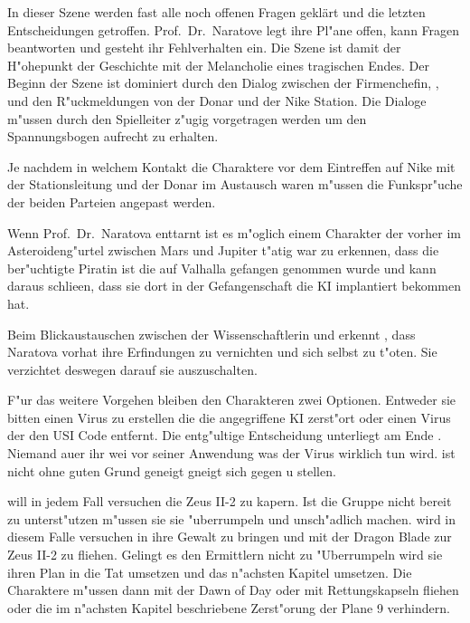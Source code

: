 \begin{remarks}
	In dieser Szene werden fast alle noch offenen Fragen geklärt und die letzten Entscheidungen getroffen. Prof.~Dr.~Naratove legt ihre Pl"ane offen, kann Fragen beantworten und gesteht ihr Fehlverhalten ein. Die Szene ist damit der H"ohepunkt der Geschichte mit der Melancholie eines tragischen Endes. Der Beginn der Szene ist dominiert durch den Dialog zwischen der Firmenchefin, \xl{}, \ml{} und den R"uckmeldungen von der Donar und der Nike Station. Die Dialoge m"ussen durch den Spielleiter z"ugig vorgetragen werden um den Spannungsbogen aufrecht zu erhalten.

	Je nachdem in welchem Kontakt die Charaktere vor dem Eintreffen auf Nike mit der Stationsleitung und der Donar im Austausch waren m"ussen die Funkspr"uche der beiden Parteien angepast werden.

	Wenn Prof.~Dr.~Naratova \xl{} enttarnt ist es m"oglich einem Charakter der vorher im Asteroideng"urtel zwischen Mars und Jupiter t"atig war zu erkennen, dass \xl{} die ber"uchtigte Piratin ist die auf Valhalla gefangen genommen wurde und kann daraus schlie\3en, dass sie dort in der Gefangenschaft die KI implantiert bekommen hat.

	Beim Blickaustauschen zwischen der Wissenschaftlerin und \xl{} erkennt \xl{}, dass Naratova vorhat ihre Erfindungen zu vernichten und sich selbst zu t"oten. Sie verzichtet deswegen darauf sie auszuschalten.

	F"ur das weitere Vorgehen bleiben den Charakteren zwei Optionen. Entweder sie bitten \ml{} einen Virus zu erstellen die die angegriffene KI zerst"ort oder einen Virus der den USI Code entfernt. Die entg"ultige Entscheidung unterliegt am Ende \ml{}. Niemand au\3er ihr wei\3 vor seiner Anwendung was der Virus wirklich tun wird. \ml{} ist  nicht ohne guten Grund geneigt gneigt sich gegen \xl{} u stellen. 
	
	\xl{} will in jedem Fall versuchen die Zeus II-2 zu kapern. Ist die Gruppe nicht bereit \xl{} zu unterst"utzen m"ussen sie sie "uberrumpeln und unsch"adlich machen. \xl{} wird in diesem Falle versuchen \ml{} in ihre Gewalt zu bringen und mit der Dragon Blade zur Zeus II-2 zu fliehen. Gelingt es den Ermittlern nicht \xl{} zu "Uberrumpeln wird sie ihren Plan in die Tat umsetzen und das  n"achsten Kapitel umsetzen. Die Charaktere m"ussen dann mit der Dawn of Day oder mit Rettungskapseln fliehen oder die im n"achsten Kapitel beschriebene Zerst"orung der Plane 9 verhindern.
\end{remarks}

